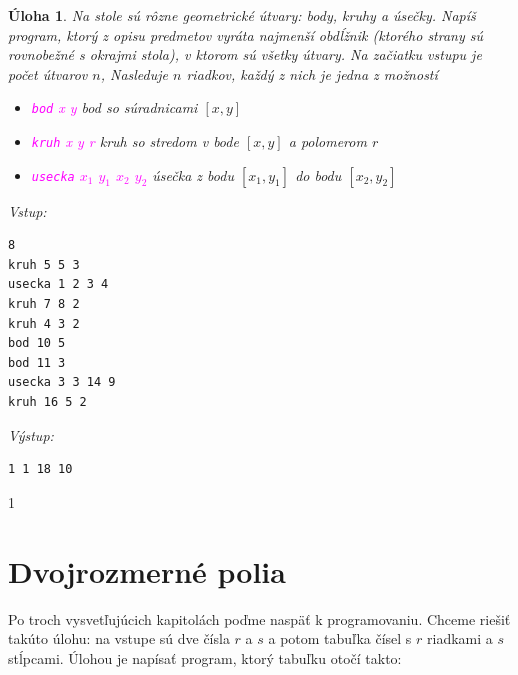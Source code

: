 \documentclass[10pt]{article}
\def\ods{\vspace*{10pt}}
\newtheorem{uloha}{Úloha}
\def\bp{\begin{minipage}[t]{0.45\textwidth}\vspace{0pt}}
\def\ep{\end{minipage}}
\def\inp{{\rm Vstup:}\\[-4.2ex]}
\def\outp{{\rm Výstup:}\\[-4.2ex]}
\def\sectviii{1} %
\def\sectviii{0} %
\begin{document}
\begin{uloha}
  Na stole sú rôzne geometrické útvary: body, kruhy a úsečky.
  Napíš program, ktorý z opisu predmetov vyráta najmenší obdĺžnik (ktorého
  strany sú rovnobežné s okrajmi stola), v ktorom sú všetky útvary.
  Na začiatku vstupu je počet útvarov $n$, Nasleduje $n$ riadkov,
  každý z nich je jedna z možností
\begin{itemize}\itemsep=-1mm
    \item \textcolor{magenta}{{\tt bod} {\em x y}} 
      bod so súradnicami $[x,y]$
    \item \textcolor{magenta}{{\tt kruh} {\em x y r}}
      kruh so stredom v bode $[x,y]$ a polomerom $r$
    \item \textcolor{magenta}{{\tt usecka} $x_1$ $y_1$ $x_2$ $y_2$}
      úsečka z bodu $[x_1,y_1]$ do bodu $[x_2,y_2]$
\end{itemize}
  \ods
\bp
\inp
\begin{verbatim}
8
kruh 5 5 3
usecka 1 2 3 4
kruh 7 8 2
kruh 4 3 2
bod 10 5
bod 11 3
usecka 3 3 14 9
kruh 16 5 2
\end{verbatim}
\ep
\hfill
\bp
\outp
\begin{verbatim}
1 1 18 10
\end{verbatim}
\ep
 
  \ods
\end{uloha}
\fi

\if\sectviii1
\section{Dvojrozmerné polia}
\label{sect:2dpolia}

Po troch vysvetľujúcich kapitolách poďme naspäť k programovaniu. 
Chceme riešiť takúto úlohu: na vstupe sú dve čísla $r$ a $s$ a potom 
tabuľka čísel s $r$ riadkami a $s$ stĺpcami. Úlohou je napísať program, ktorý
tabuľku otočí takto:
\end{document}
